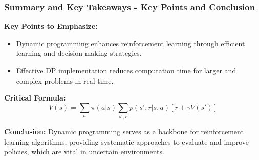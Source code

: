 \documentclass{beamer}
\begin{document}
\begin{frame}[fragile]
    \frametitle{Summary and Key Takeaways - Key Points and Conclusion}
    \textbf{Key Points to Emphasize:}
    
    \begin{itemize}
        \item Dynamic programming enhances reinforcement learning through efficient learning and decision-making strategies.
        \item Effective DP implementation reduces computation time for larger and complex problems in real-time.
    \end{itemize}

    \textbf{Critical Formula:}
    \begin{equation}
     V(s) = \sum_{a} \pi(a|s) \sum_{s', r} p(s', r | s, a) [r + \gamma V(s')]
    \end{equation}

    \textbf{Conclusion:}
    Dynamic programming serves as a backbone for reinforcement learning algorithms, providing systematic approaches to evaluate and improve policies, which are vital in uncertain environments.
\end{frame}
\end{document}
